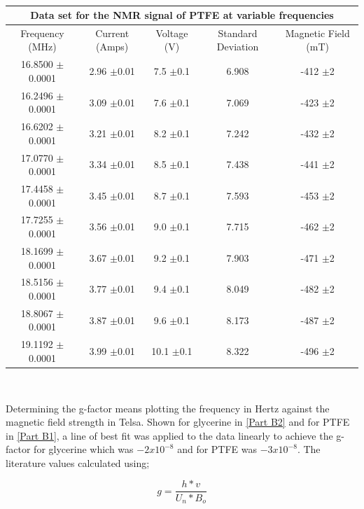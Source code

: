 \documentclass[12pt]{article}
\begin{document}
\begin{table}[H]
\begin{center}
 \footnotesize
 \begin{tabular}{|c||c||c||c||c|}
 \hline
 \multicolumn{5}{|c|}{Data set for the NMR signal of PTFE at variable frequencies} \\
 \hline
 Frequency (MHz)  & Current (Amps)  & Voltage (V) & Standard Deviation & Magnetic Field (mT)\\
 \hline \hline
 16.8500 $\pm$0.0001  & 2.96 $\pm$0.01  & 7.5 $\pm$0.1 & 6.908 &  -412 $\pm$2 \\
 \hline
 16.2496 $\pm$0.0001  & 3.09 $\pm$0.01  & 7.6 $\pm$0.1 & 7.069 &  -423 $\pm$2 \\
 \hline
 16.6202 $\pm$0.0001  & 3.21 $\pm$0.01  & 8.2 $\pm$0.1 & 7.242 &  -432 $\pm$2 \\
 \hline
 17.0770 $\pm$0.0001  & 3.34 $\pm$0.01  & 8.5 $\pm$0.1 & 7.438 &  -441 $\pm$2 \\
 \hline
 17.4458 $\pm$0.0001  & 3.45 $\pm$0.01  & 8.7 $\pm$0.1 & 7.593 &  -453 $\pm$2 \\
 \hline
 17.7255 $\pm$0.0001  & 3.56 $\pm$0.01  & 9.0 $\pm$0.1 & 7.715 &  -462 $\pm$2 \\
 \hline
 18.1699 $\pm$0.0001  & 3.67 $\pm$0.01  & 9.2 $\pm$0.1 & 7.903 &  -471 $\pm$2 \\
 \hline
 18.5156 $\pm$0.0001  & 3.77 $\pm$0.01  & 9.4 $\pm$0.1 & 8.049 &  -482 $\pm$2 \\
 \hline
 18.8067 $\pm$0.0001  & 3.87 $\pm$0.01  & 9.6 $\pm$0.1 & 8.173 &  -487 $\pm$2 \\
 \hline
 19.1192 $\pm$0.0001  & 3.99 $\pm$0.01  & 10.1 $\pm$0.1 & 8.322 &  -496 $\pm$2 \\
 \hline
 \end{tabular} \\ 
 \caption{}
 \label{PTFE NMR Spec}
\end{center}
\end{table}

Determining the g-factor means plotting the frequency in Hertz against the magnetic field strength in Telsa. Shown for glycerine in \cref{Part B2} and for PTFE in \cref{Part B1}, a line of best fit was applied to the data linearly to achieve the g-factor for glycerine which was $-2x10^{-8}$ and for PTFE was $-3x10^{-8}$. The literature values calculated using;

\begin{equation}
g= \dfrac{h*v}{U_n * B_o}
\label{Log Tramsittance 1}
\end{equation}
\end{document}
